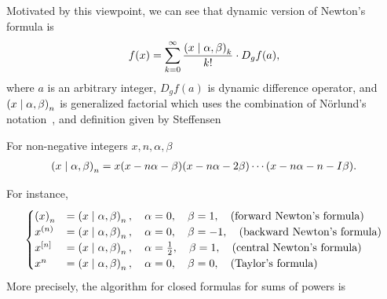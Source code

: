 Motivated by this viewpoint, we can see that dynamic version of Newton's formula
is
\begin{align}
  \label{eq:generalized-newtons-formula}
  f(x) = \sum_{k=0}^{\infty} \frac{\left(x\mid \alpha, \beta\right)_{k}}{k!} \cdot D_g f(a),
\end{align}
where $a$ is an arbitrary integer, $D_g f(a)$ is dynamic difference operator,
and $\left(x\mid \alpha, \beta\right)_{n} $
is generalized factorial which uses the combination of N\"orlund's notation~\cite{Norlund1924},
and definition given by Steffensen~\cite{steffensen1933definition}
\begin{definition} For non-negative integers $x,n,\alpha,\beta$
  \label{prop:generalized-factorial}
  \begin{align*}
    \left(x\mid \alpha, \beta\right)_{n} = x(x-n\alpha - \beta)(x-n\alpha - 2\beta)\cdots(x-n\alpha - n - I\beta).
  \end{align*}
\end{definition}
For instance,
\begin{align*}
  \begin{cases}
    \left(x\right)_{n} &= \left(x\mid \alpha, \beta\right)_{n}, \quad \alpha=0, \quad \beta =1, \quad \text{(forward Newton's formula)} \\
    x^{\left(n\right)}  &= \left(x\mid \alpha, \beta\right)_{n}, \quad \alpha=0, \quad \beta =-1,  \quad \text{(backward Newton's formula)}  \\
    x^{[n]} &= \left(x\mid \alpha, \beta\right)_{n}, \quad \alpha=\frac{1}{2}, \quad \beta =1,  \quad \text{(central Newton's formula)}\\
    x^n                     &= \left(x\mid \alpha, \beta\right)_{n}, \quad \alpha=0, \quad \beta =0,  \quad \text{(Taylor's formula)}
  \end{cases}
\end{align*}
More precisely, the algorithm for closed formulas for sums of powers is
